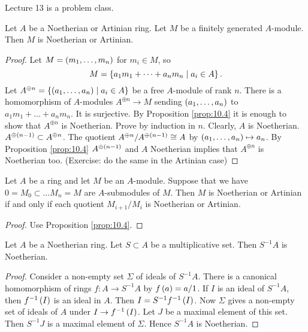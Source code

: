 Lecture 13 is a problem class.


\begin{corollary}
Let $ A $ be a Noetherian or Artinian ring. Let $ M $ be a finitely generated $ A $-module. Then $ M $ is Noetherian or Artinian.
\end{corollary}

\begin{proof}
Let $ M = \left( m_1, \dots, m_n \right) $ for $ m_i \in M $, so
$$ M = \left\{ a_1m_1 + \dots + a_nm_n \mid a_i \in A \right\}. $$
Let $ A^{\oplus n} = \left\{ \left( a_1, \dots, a_n \right) \mid a_i \in A \right\} $ be a free $ A $-module of rank $ n $. There is a homomorphism of $ A $-modules $ A^{\oplus n} \to M $ sending $ \left( a_1, \dots, a_n \right) $ to $ a_1m_1 + \dots + a_nm_n $. It is surjective. By Proposition \ref{prop:10.4} it is enough to show that $ A^{\oplus n} $ is Noetherian. Prove by induction in $ n $. Clearly, $ A $ is Noetherian. $ A^{\oplus \left( n - 1 \right)} \subset A^{\oplus n} $. The quotient $ A^{\oplus n} / A^{\oplus \left( n - 1 \right)} \cong A $ by $ \left( a_1, \dots, a_n \right) \mapsto a_n $. By Proposition \ref{prop:10.4} $ A^{\oplus \left( n - 1 \right)} $ and $ A $ Noetherian implies that $ A^{\oplus n} $ is Noetherian too. (Exercise: do the same in the Artinian case)
\end{proof}

\begin{corollary}
\label{cor:10.6}
Let $ A $ be a ring and let $ M $ be an $ A $-module. Suppose that we have $ 0 = M_0 \subset \dots M_n = M $ are $ A $-submodules of $ M $. Then $ M $ is Noetherian or Artinian if and only if each quotient $ M_{i + 1} / M_i $ is Noetherian or Artinian.
\end{corollary}

\begin{proof}
Use Proposition \ref{prop:10.4}.
\end{proof}

\begin{lemma}
Let $ A $ be a Noetherian ring. Let $ S \subset A $ be a multiplicative set. Then $ S^{-1}A $ is Noetherian.
\end{lemma}

\begin{proof}
Consider a non-empty set $ \Sigma $ of ideals of $ S^{-1}A $. There is a canonical homomorphism of rings $ f : A \to S^{-1}A $ by $ f\left( a \right) = a / 1 $. If $ I $ is an ideal of $ S^{-1}A $, then $ f^{-1}\left( I \right) $ is an ideal in $ A $. Then $ I = S^{-1}f^{-1}\left( I \right) $. Now $ \Sigma $ gives a non-empty set of ideals of $ A $ under $ I \to f^{-1}\left( I \right) $. Let $ J $ be a maximal element of this set. Then $ S^{-1}J $ is a maximal element of $ \Sigma $. Hence $ S^{-1}A $ is Noetherian.
\end{proof}

